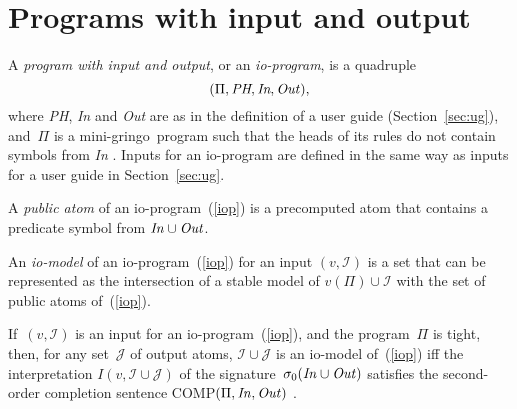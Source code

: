 \documentclass{article}
\def\beq{\begin{equation}}
\def\eeq#1{\label{#1}\end{equation}}
\def\gringo{{\sc gringo}}
\newcommand{\I}{\mathcal{I}}
\newcommand{\J}{\mathcal{J}}
\begin{document}
\section{Programs with input and output} \label{appc}

A \emph{program with input and output}, or an \emph{io-program},
is a quadruple
\beq
(\Pi,\emph{PH},\emph{In},\emph{Out\/}),
\eeq{iop}
where \emph{PH}, \emph{In} and \emph{Out} are as in the definition of
a user guide (Section~\ref{sec:ug}), and~$\Pi$ is a mini-\gringo\ program
such that the heads of its rules do not contain symbols from \emph{In}
\cite[Section~5.1]{fan20}.  Inputs for an io-program are defined in the same
way as inputs for a user guide in Section~\ref{sec:ug}.

A \emph{public atom} of an io-program~(\ref{iop}) is a precomputed atom
that contains a predicate symbol from $\emph{In\/}\cup\emph{Out\/}$.

An \emph{io-model} of an io-program~(\ref{iop}) for an input $(v,\I)$ is
a set that can be represented as the intersection of a stable model
of $v(\Pi)\cup\I$ with the set of public atoms of~(\ref{iop}).

If~$(v,\I)$ is an input for an io-program~(\ref{iop}), and the program~$\Pi$
is tight, then, for any set~$\J$ of output atoms, $\I\cup\J$ is an io-model
of~(\ref{iop}) iff the interpretation $I(v,\I\cup\J)$ of the
signature~$\sigma_0(\emph{In\/}\cup\emph{Out\/})$ satisfies the
second-order completion sentence COMP$(\Pi,\emph{In\/},\emph{Out\/})$
\cite[Theorem~2]{fan20}.
\end{document}
